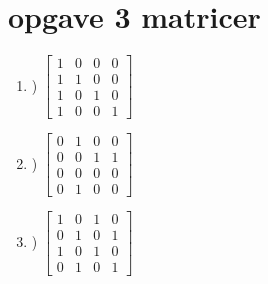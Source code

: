 \documentclass[a4paper,12pt]{article}
\begin{document}
\section{opgave 3 matricer}
\begin{enumerate}
	\item) \(\begin{bmatrix}
			1 & 0 & 0 & 0\\
			1 & 1 & 0 & 0\\
			1 & 0 & 1 & 0\\
			1 & 0 & 0 & 1
			\end{bmatrix}\)
			
	\item) \(\begin{bmatrix}
			0 & 1 & 0 & 0\\
			0 & 0 & 1 & 1\\
			0 & 0 & 0 & 0\\
			0 & 1 & 0 & 0
			\end{bmatrix}\)
			
	\item) \(\begin{bmatrix}
			1 & 0 & 1 & 0\\
			0 & 1 & 0 & 1\\
			1 & 0 & 1 & 0\\
			0 & 1 & 0 & 1
			\end{bmatrix}\)
\end{enumerate}
\end{document}
